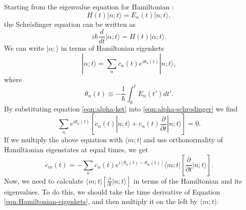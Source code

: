 Starting from the eigenvalue equation for Hamiltonian :
%
\begin{equation}
\label{eqn:Hamiltonian-eigenkets}
H(t)  |n;t\rangle = E_n(t) |n;t\rangle ,
\end{equation}
the Schr\"{o}dinger equation can be written as
%
\begin{equation}
\label{eqn:alpha-schrodinger}
i \hbar \frac{d}{dt} |\alpha ; t \rangle = H(t) |\alpha ; t\rangle .
\end{equation}
%
We can write $|\alpha;\rangle$ in terms of Hamiltonian eigenkets
%
\begin{equation}
\label{eqn:alpha-ket}
|\alpha;t\rangle=\sum_n c_n(t) e^{i \theta_n(t)} |n;t\rangle ,
\end{equation}
%
where
%
\begin{equation}
\theta_n(t)\equiv-\frac{1}{\hbar} \int_0^t E_n(t') dt'.
\end{equation}
%
By substituting equation \ref{eqn:alpha-ket} into
\ref{eqn:alpha-schrodinger} we find
%
\begin{equation}
\sum_n e^{i \theta_n(t)} \left[ \dot{c}_n(t) |n;t \rangle +c_n(t) \frac{\partial}{\partial t} |n;t \rangle \right]=0.
\end{equation}
%
If we multiply the above equation with $\langle m;t|$ and use
orthonormality of Hamiltionian eigenstates at equal times, we get
%
\begin{equation}
\dot{c}_m(t)=-\sum_n c_n(t)e^{i \left[ \theta_n(t)-\theta_m(t)\right]} \langle m;t| \left[ \frac{\partial}{\partial t} |n;t \rangle \right] .
\end{equation}
%
Now, we need to calculate
$\langle m;t| \left[ \frac{\partial}{\partial t} |n;t \rangle \right]$
in terms of the Hamiltonian and its eigenvalues. To do this, we should
take the time derivative of Equation \ref{eqn:Hamiltonian-eigenkets},
and then multiply it on the left by $\langle m;t|$:

